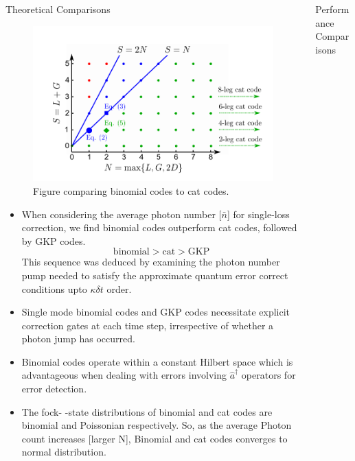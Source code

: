 \documentclass[8pt,final,hyperref={pdfpagelabels=false}]{beamer}
\theoremstyle{plain}
\newcommand\0{\mathbf{0}}
\begin{document}
\begin{frame}
\begin{columns}[t]
\begin{column}{.23\textwidth}
\begin{block}{Theoretical Comparisons}
\begin{figure}
            \begin{minipage}{0.49\textwidth}
                \centering
                \includegraphics[width=1\linewidth,keepaspectratio]{Screenshot (958).png}	
\caption{Figure comparing binomial codes to cat codes.\cite{michael2016new} }
            \end{minipage}
        \end{figure}
        \begin{itemize}
        \item When considering the average photon number [$\bar n$] for single-loss correction, we find binomial codes outperform cat codes, followed by GKP codes. \\
        $$\text{binomial} > \text{cat} > \text{GKP}$$
        This sequence was deduced by examining the photon number pump needed to satisfy the approximate quantum error correct conditions upto $\kappa\delta t$ order.

            \item Single mode binomial codes and GKP codes necessitate explicit correction gates at each time step, irrespective of whether a photon jump has occurred. 

            
            \item Binomial codes operate within a constant Hilbert space which is advantageous when dealing with errors involving $\hat{a}^\dag$ operators for error detection.
            \item The fock- -state distributions of binomial and cat codes are binomial and Poissonian respectively. So, as the average Photon count increases [larger N],  Binomial and cat codes converges to normal distribution.

        \end{itemize}
    \end{block}
\end{column} 
\begin{column}{.23\textwidth} 
    \begin{block}{Performance Comparisons}


\end{block}
\end{column}
\end{columns}
\end{frame}
\end{document}
